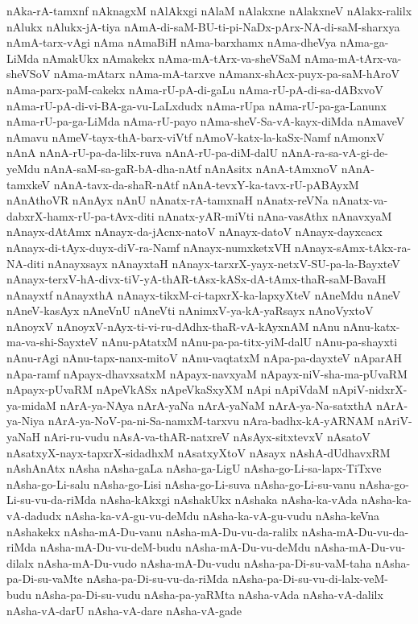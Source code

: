 {nAka-rA-tamxnf
nAknagxM
nAlAkxgi
nAlaM
nAlakxne
nAlakxneV
nAlakx-ralilx
nAlukx
nAlukx-jA-tiya
nAmA-di-saM-BU-ti-pi-NaDx-pArx-NA-di-saM-sharxya
nAmA-tarx-vAgi
nAma
nAmaBiH
nAma-barxhamx
nAma-dheVya
nAma-ga-LiMda
nAmakUkx
nAmakekx
nAma-mA-tArx-va-sheVSaM
nAma-mA-tArx-va-sheVSoV
nAma-mAtarx
nAma-mA-tarxve
nAmanx-shAcx-puyx-pa-saM-hAroV
nAma-parx-paM-cakekx
nAma-rU-pA-di-gaLu
nAma-rU-pA-di-sa-dABxvoV
nAma-rU-pA-di-vi-BA-ga-vu-LaLxdudx
nAma-rUpa
nAma-rU-pa-ga-Lanunx
nAma-rU-pa-ga-LiMda
nAma-rU-payo
nAma-sheV-Sa-vA-kayx-diMda
nAmaveV
nAmavu
nAmeV-tayx-thA-barx-viVtf
nAmoV-katx-la-kaSx-Namf
nAmonxV
nAnA
nAnA-rU-pa-da-lilx-ruva
nAnA-rU-pa-diM-dalU
nAnA-ra-sa-vA-gi-de-yeMdu
nAnA-saM-sa-gaR-bA-dha-nAtf
nAnAsitx
nAnA-tAmxnoV
nAnA-tamxkeV
nAnA-tavx-da-shaR-nAtf
nAnA-tevxY-ka-tavx-rU-pABAyxM
nAnAthoVR
nAnAyx
nAnU
nAnatx-rA-tamxnaH
nAnatx-reVNa
nAnatx-va-dabxrX-hamx-rU-pa-tAvx-diti
nAnatx-yAR-miVti
nAna-vasAthx
nAnavxyaM
nAnayx-dAtAmx
nAnayx-da-jAcnx-natoV
nAnayx-datoV
nAnayx-dayxcacx
nAnayx-di-tAyx-duyx-diV-ra-Namf
nAnayx-numxketxVH
nAnayx-sAmx-tAkx-ra-NA-diti
nAnayxsayx
nAnayxtaH
nAnayx-tarxrX-yayx-netxV-SU-pa-la-BayxteV
nAnayx-terxV-hA-divx-tiV-yA-thAR-tAsx-kASx-dA-tAmx-thaR-saM-BavaH
nAnayxtf
nAnayxthA
nAnayx-tikxM-ci-tapxrX-ka-lapxyXteV
nAneMdu
nAneV
nAneV-kasAyx
nAneVnU
nAneVti
nAnimxV-ya-kA-yaRsayx
nAnoVyxtoV
nAnoyxV
nAnoyxV-nAyx-ti-vi-ru-dAdhx-thaR-vA-kAyxnAM
nAnu
nAnu-katx-ma-va-shi-SayxteV
nAnu-pAtatxM
nAnu-pa-pa-titx-yiM-dalU
nAnu-pa-shayxti
nAnu-rAgi
nAnu-tapx-nanx-mitoV
nAnu-vaqtatxM
nApa-pa-dayxteV
nAparAH
nApa-ramf
nApayx-dhavxsatxM
nApayx-navxyaM
nApayx-niV-sha-ma-pUvaRM
nApayx-pUvaRM
nApeVkASx
nApeVkaSxyXM
nApi
nApiVdaM
nApiV-nidxrX-ya-midaM
nArA-ya-NAya
nArA-yaNa
nArA-yaNaM
nArA-ya-Na-satxthA
nArA-ya-Niya
nArA-ya-NoV-pa-ni-Sa-namxM-tarxvu
nAra-badhx-kA-yARNAM
nAriV-yaNaH
nAri-ru-vudu
nAsA-va-thAR-natxreV
nAsAyx-sitxtevxV
nAsatoV
nAsatxyX-nayx-tapxrX-sidadhxM
nAsatxyXtoV
nAsayx
nAshA-dUdhavxRM
nAshAnAtx
nAsha
nAsha-gaLa
nAsha-ga-LigU
nAsha-go-Li-sa-lapx-TiTxve
nAsha-go-Li-salu
nAsha-go-Lisi
nAsha-go-Li-suva
nAsha-go-Li-su-vanu
nAsha-go-Li-su-vu-da-riMda
nAsha-kAkxgi
nAshakUkx
nAshaka
nAsha-ka-vAda
nAsha-ka-vA-dadudx
nAsha-ka-vA-gu-vu-deMdu
nAsha-ka-vA-gu-vudu
nAsha-keVna
nAshakekx
nAsha-mA-Du-vanu
nAsha-mA-Du-vu-da-ralilx
nAsha-mA-Du-vu-da-riMda
nAsha-mA-Du-vu-deM-budu
nAsha-mA-Du-vu-deMdu
nAsha-mA-Du-vu-dilalx
nAsha-mA-Du-vudo
nAsha-mA-Du-vudu
nAsha-pa-Di-su-vaM-taha
nAsha-pa-Di-su-vaMte
nAsha-pa-Di-su-vu-da-riMda
nAsha-pa-Di-su-vu-di-lalx-veM-budu
nAsha-pa-Di-su-vudu
nAsha-pa-yaRMta
nAsha-vAda
nAsha-vA-dalilx
nAsha-vA-darU
nAsha-vA-dare
nAsha-vA-gade
}
